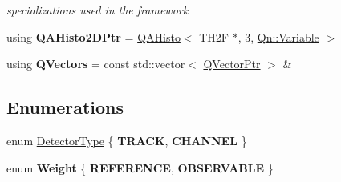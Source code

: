 \begin{DoxyCompactItemize}
\begin{DoxyCompactList}\small\item\em specializations used in the framework \end{DoxyCompactList}\item 
\mbox{\label{namespaceQn_a2a7e1a287c88e337fdc33cbcc6706def}} 
using {\bfseries Q\+A\+Histo2\+D\+Ptr} = \mbox{\hyperlink{classQn_1_1QAHisto}{Q\+A\+Histo}}$<$ T\+H2F $\ast$, 3, \mbox{\hyperlink{classQn_1_1Variable}{Qn\+::\+Variable}} $>$
\item 
\mbox{\label{namespaceQn_af7f4461194fe42f3495e9151c28b719e}} 
using {\bfseries Q\+Vectors} = const std\+::vector$<$ \mbox{\hyperlink{classQn_1_1QVectorPtr}{Q\+Vector\+Ptr}} $>$ \&
\end{DoxyCompactItemize}
\subsection*{Enumerations}
\begin{DoxyCompactItemize}
\item 
enum \mbox{\hyperlink{namespaceQn_adba56b19bd9207127cdc7227d9e03a05}{Detector\+Type}} \{ {\bfseries T\+R\+A\+CK}, 
{\bfseries C\+H\+A\+N\+N\+EL}
 \}
\item 
\mbox{\label{namespaceQn_a76a6af0195f7b8b4fc63277f0a2ba262}} 
enum {\bfseries Weight} \{ {\bfseries R\+E\+F\+E\+R\+E\+N\+CE}, 
{\bfseries O\+B\+S\+E\+R\+V\+A\+B\+LE}
 \}
\end{DoxyCompactItemize}
